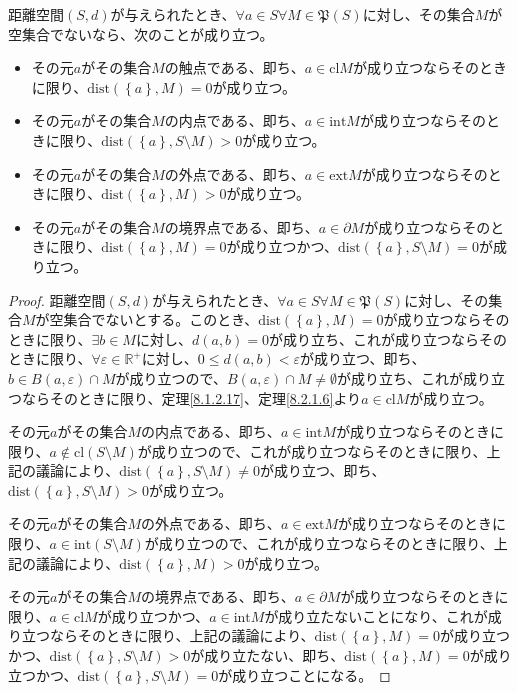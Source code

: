 \documentclass[dvipdfmx]{jsarticle}
\begin{document}
\begin{thm}\label{8.2.3.5}
距離空間$(S,d)$が与えられたとき、$\forall a \in S\forall M \in \mathfrak{P}(S)$に対し、その集合$M$が空集合でないなら、次のことが成り立つ。
\begin{itemize}
\item
  その元$a$がその集合$M$の触点である、即ち、$a \in {\mathrm{cl}}M$が成り立つならそのときに限り、$\mathrm{dist}\left( \left\{ a \right\},M \right) = 0$が成り立つ。
\item
  その元$a$がその集合$M$の内点である、即ち、$a \in {\mathrm{int}}M$が成り立つならそのときに限り、$\mathrm{dist}\left( \left\{ a \right\},S \setminus M \right) > 0$が成り立つ。
\item
  その元$a$がその集合$M$の外点である、即ち、$a \in {\mathrm{ext}}M$が成り立つならそのときに限り、$\mathrm{dist}\left( \left\{ a \right\},M \right) > 0$が成り立つ。
\item
  その元$a$がその集合$M$の境界点である、即ち、$a \in \partial M$が成り立つならそのときに限り、$\mathrm{dist}\left( \left\{ a \right\},M \right) = 0$が成り立つかつ、$\mathrm{dist}\left( \left\{ a \right\},S \setminus M \right) = 0$が成り立つ。
\end{itemize}
\end{thm}
\begin{proof}
距離空間$(S,d)$が与えられたとき、$\forall a \in S\forall M \in \mathfrak{P}(S)$に対し、その集合$M$が空集合でないとする。このとき、$\mathrm{dist}\left( \left\{ a \right\},M \right) = 0$が成り立つならそのときに限り、$\exists b \in M$に対し、$d(a,b) = 0$が成り立ち、これが成り立つならそのときに限り、$\forall\varepsilon \in \mathbb{R}^{+}$に対し、$0 \leq d(a,b) < \varepsilon$が成り立つ、即ち、$b \in B(a,\varepsilon) \cap M$が成り立つので、$B(a,\varepsilon) \cap M \neq \emptyset$が成り立ち、これが成り立つならそのときに限り、定理\ref{8.1.2.17}、定理\ref{8.2.1.6}より$a \in {\mathrm{cl}}M$が成り立つ。\par
その元$a$がその集合$M$の内点である、即ち、$a \in {\mathrm{int}}M$が成り立つならそのときに限り、$a \notin {\mathrm{cl}}(S \setminus M)$が成り立つので、これが成り立つならそのときに限り、上記の議論により、$\mathrm{dist}\left( \left\{ a \right\},S \setminus M \right) \neq 0$が成り立つ、即ち、$\mathrm{dist}\left( \left\{ a \right\},S \setminus M \right) > 0$が成り立つ。\par
その元$a$がその集合$M$の外点である、即ち、$a \in {\mathrm{ext}}M$が成り立つならそのときに限り、$a \in {\mathrm{int}}(S \setminus M)$が成り立つので、これが成り立つならそのときに限り、上記の議論により、$\mathrm{dist}\left( \left\{ a \right\},M \right) > 0$が成り立つ。\par
その元$a$がその集合$M$の境界点である、即ち、$a \in \partial M$が成り立つならそのときに限り、$a \in {\mathrm{cl}}M$が成り立つかつ、$a \in {\mathrm{int}}M$が成り立たないことになり、これが成り立つならそのときに限り、上記の議論により、$\mathrm{dist}\left( \left\{ a \right\},M \right) = 0$が成り立つかつ、$\mathrm{dist}\left( \left\{ a \right\},S \setminus M \right) > 0$が成り立たない、即ち、$\mathrm{dist}\left( \left\{ a \right\},M \right) = 0$が成り立つかつ、$\mathrm{dist}\left( \left\{ a \right\},S \setminus M \right) = 0$が成り立つことになる。
\end{proof}
\end{document}
